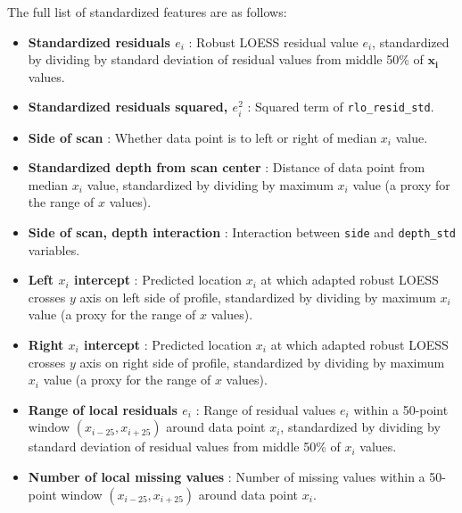 \documentclass[12pt]{article}
\begin{document}
The full list of standardized features are as follows:

\begin{itemize}

\item[] \textbf{Standardized residuals $e_i$} : Robust LOESS residual value $e_i$, standardized by dividing by standard deviation of residual values from middle 50\% of $\mathbf{x_i}$ values.  

\item[] \textbf{Standardized residuals squared, $e_i^2$} : Squared term of \texttt{rlo\_resid\_std}.   

\item[] \textbf{Side of scan} : Whether data point is to left or right of median $x_i$ value.  

\item[] \textbf{Standardized depth from scan center} : Distance of data point from median $x_i$ value, standardized by dividing by maximum $x_i$ value (a proxy for the range of $x$ values).  

\item[] \textbf{Side of scan, depth interaction} : Interaction between \texttt{side} and \texttt{depth\_std} variables.  

\item[] \textbf{Left $x_i$ intercept} : Predicted location $x_i$ at which adapted robust LOESS crosses $y$ axis on left side of profile, standardized by dividing by maximum $x_i$ value (a proxy for the range of $x$ values).  

\item[] \textbf{Right $x_i$ intercept} : Predicted location $x_i$ at which adapted robust LOESS crosses $y$ axis on right side of profile, standardized by dividing by maximum $x_i$ value (a proxy for the range of $x$ values).  

\item[] \textbf{Range of local residuals $e_i$} : Range of residual values $e_i$ within a 50-point window $(x_{i-25}, x_{i+25})$ around data point $x_i$, standardized by dividing by standard deviation of residual values from middle 50\% of $x_i$ values.  

\item[] \textbf{Number of local missing values} : Number of missing values within a 50-point window $(x_{i-25}, x_{i+25})$ around data point $x_i$.  


\end{itemize}
\end{document}
